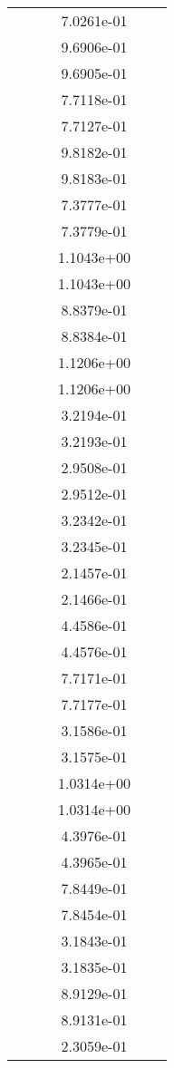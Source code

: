 \begin{xltabular}{\textwidth}{r|rS[table-format=1.3e+2]S[table-format=1.4e+2]S[table-format=1.4e+2]S[table-format=-1.5]}
&  &  & 7.0261e-01 & & \\
&  &  & 9.6906e-01 & & \\
&  &  & 9.6905e-01 & & \\
&  &  & 7.7118e-01 & & \\
&  &  & 7.7127e-01 & & \\
&  &  & 9.8182e-01 & & \\
&  &  & 9.8183e-01 & & \\
&  &  & 7.3777e-01 & & \\
&  &  & 7.3779e-01 & & \\
&  &  & 1.1043e+00 & & \\
&  &  & 1.1043e+00 & & \\
&  &  & 8.8379e-01 & & \\
&  &  & 8.8384e-01 & & \\
&  &  & 1.1206e+00 & & \\
&  &  & 1.1206e+00 & & \\
&  &  & 3.2194e-01 & & \\
&  &  & 3.2193e-01 & & \\
&  &  & 2.9508e-01 & & \\
&  &  & 2.9512e-01 & & \\
&  &  & 3.2342e-01 & & \\
&  &  & 3.2345e-01 & & \\
&  &  & 2.1457e-01 & & \\
&  &  & 2.1466e-01 & & \\
&  &  & 4.4586e-01 & & \\
&  &  & 4.4576e-01 & & \\
&  &  & 7.7171e-01 & & \\
&  &  & 7.7177e-01 & & \\
&  &  & 3.1586e-01 & & \\
&  &  & 3.1575e-01 & & \\
&  &  & 1.0314e+00 & & \\
&  &  & 1.0314e+00 & & \\
&  &  & 4.3976e-01 & & \\
&  &  & 4.3965e-01 & & \\
&  &  & 7.8449e-01 & & \\
&  &  & 7.8454e-01 & & \\
&  &  & 3.1843e-01 & & \\
&  &  & 3.1835e-01 & & \\
&  &  & 8.9129e-01 & & \\
&  &  & 8.9131e-01 & & \\
&  &  & 2.3059e-01 & & \\

\end{xltabular}
